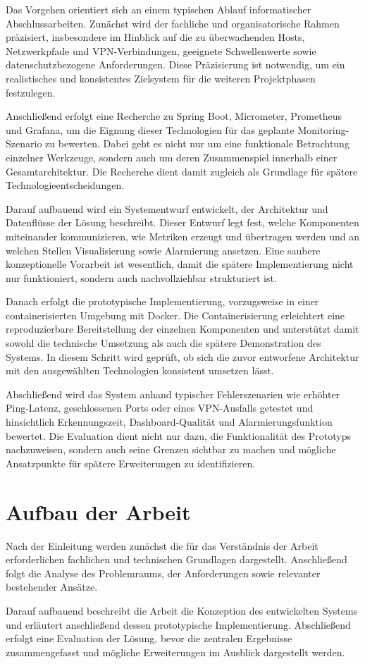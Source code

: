 Das Vorgehen orientiert sich an einem typischen Ablauf informatischer Abschlussarbeiten. Zunächst wird der fachliche und organisatorische Rahmen präzisiert, insbesondere im Hinblick auf die zu überwachenden Hosts, Netzwerkpfade und VPN-Verbindungen, geeignete Schwellenwerte sowie datenschutzbezogene Anforderungen. Diese Präzisierung ist notwendig, um ein realistisches und konsistentes Zielsystem für die weiteren Projektphasen festzulegen.  

Anschließend erfolgt eine Recherche zu Spring Boot, Micrometer, Prometheus und Grafana, um die Eignung dieser Technologien für das geplante Monitoring-Szenario zu bewerten. Dabei geht es nicht nur um eine funktionale Betrachtung einzelner Werkzeuge, sondern auch um deren Zusammenspiel innerhalb einer Gesamtarchitektur. Die Recherche dient damit zugleich als Grundlage für spätere Technologieentscheidungen.  

Darauf aufbauend wird ein Systementwurf entwickelt, der Architektur und Datenflüsse der Lösung beschreibt. Dieser Entwurf legt fest, welche Komponenten miteinander kommunizieren, wie Metriken erzeugt und übertragen werden und an welchen Stellen Visualisierung sowie Alarmierung ansetzen. Eine saubere konzeptionelle Vorarbeit ist wesentlich, damit die spätere Implementierung nicht nur funktioniert, sondern auch nachvollziehbar strukturiert ist.  

Danach erfolgt die prototypische Implementierung, vorzugsweise in einer containerisierten Umgebung mit Docker. Die Containerisierung erleichtert eine reproduzierbare Bereitstellung der einzelnen Komponenten und unterstützt damit sowohl die technische Umsetzung als auch die spätere Demonstration des Systems. In diesem Schritt wird geprüft, ob sich die zuvor entworfene Architektur mit den ausgewählten Technologien konsistent umsetzen lässt.  

Abschließend wird das System anhand typischer Fehlerszenarien wie erhöhter Ping-Latenz, geschlossenen Ports oder eines VPN-Ausfalls getestet und hinsichtlich Erkennungszeit, Dashboard-Qualität und Alarmierungsfunktion bewertet. Die Evaluation dient nicht nur dazu, die Funktionalität des Prototyps nachzuweisen, sondern auch seine Grenzen sichtbar zu machen und mögliche Ansatzpunkte für spätere Erweiterungen zu identifizieren.  

\section{Aufbau der Arbeit}

Nach der Einleitung werden zunächst die für das Verständnis der Arbeit erforderlichen fachlichen und technischen Grundlagen dargestellt. Anschließend folgt die Analyse des Problemraums, der Anforderungen sowie relevanter bestehender Ansätze.

Darauf aufbauend beschreibt die Arbeit die Konzeption des entwickelten Systems und erläutert anschließend dessen prototypische Implementierung. Abschließend erfolgt eine Evaluation der Lösung, bevor die zentralen Ergebnisse zusammengefasst und mögliche Erweiterungen im Ausblick dargestellt werden.